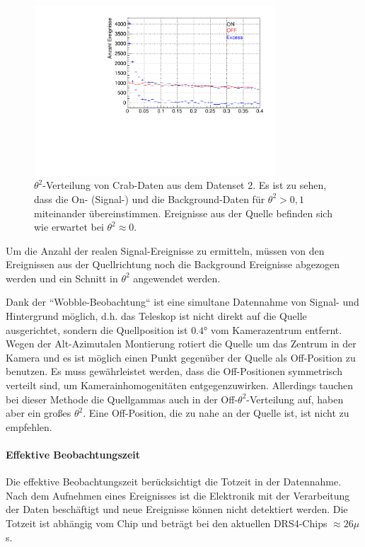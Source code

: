 \begin{figure}
    \centering
    \includegraphics[width=0.8\textwidth]{./Plots/04_MrkAnalyse/Datenset2/Crab_Theta2.pdf}
    \caption{$\theta^2$-Verteilung von Crab-Daten aus dem Datenset 2. 
    Es ist zu sehen, dass die On- (Signal-) und die Background-Daten für $\theta^2 > 0,1$ miteinander übereinstimmen.
    Ereignisse aus der Quelle befinden sich wie erwartet bei $\theta^2 \approx 0$.
    }
    \label{Crab_Theta2}
\end{figure}

Um die Anzahl der realen Signal-Ereignisse zu ermitteln, müssen von den Ereignissen aus der Quellrichtung noch die Background Ereignisse abgezogen werden und ein Schnitt in $\theta^2$ angewendet werden.

Dank der ``Wobble-Beobachtung`` ist eine simultane Datennahme von Signal- und Hintergrund möglich, d.h. das Teleskop ist nicht direkt auf die Quelle ausgerichtet, sondern die Quellposition ist $0.4°$ vom Kamerazentrum entfernt.
Wegen der Alt-Azimutalen Montierung rotiert die Quelle um das Zentrum in der Kamera und es ist möglich einen Punkt gegenüber der Quelle als Off-Position zu benutzen.
Es muss gewährleistet werden, dass die Off-Positionen symmetrisch verteilt sind, um Kamerainhomogenitäten entgegenzuwirken.
Allerdings tauchen bei dieser Methode die Quellgammas auch in der Off-$\theta^2$-Verteilung auf, haben aber ein großes $\theta^2$.
Eine Off-Position, die zu nahe an der Quelle ist, ist nicht zu empfehlen.

\paragraph{Effektive Beobachtungszeit}
Die effektive Beobachtungszeit berücksichtigt die Totzeit in der Datennahme.
Nach dem Aufnehmen eines Ereignisses ist die Elektronik mit der Verarbeitung der Daten beschäftigt und neue Ereignisse können nicht detektiert werden.
Die Totzeit ist abhängig vom Chip und beträgt bei den aktuellen DRS4-Chips $\approx 26\mu$s.

